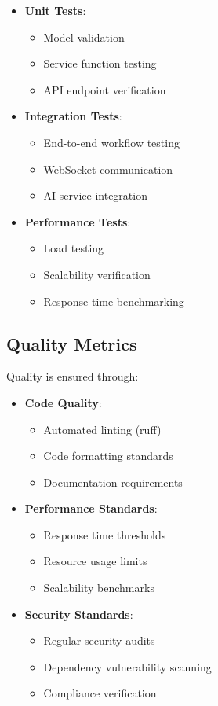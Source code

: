 \begin{itemize}
  \item \textbf{Unit Tests}:
    \begin{itemize}
      \item Model validation
      \item Service function testing
      \item API endpoint verification
    \end{itemize}
    
  \item \textbf{Integration Tests}:
    \begin{itemize}
      \item End-to-end workflow testing
      \item WebSocket communication
      \item AI service integration
    \end{itemize}
    
  \item \textbf{Performance Tests}:
    \begin{itemize}
      \item Load testing
      \item Scalability verification
      \item Response time benchmarking
    \end{itemize}
\end{itemize}

\subsection{Quality Metrics}
Quality is ensured through:

\begin{itemize}
  \item \textbf{Code Quality}:
    \begin{itemize}
      \item Automated linting (ruff)
      \item Code formatting standards
      \item Documentation requirements
    \end{itemize}
    
  \item \textbf{Performance Standards}:
    \begin{itemize}
      \item Response time thresholds
      \item Resource usage limits
      \item Scalability benchmarks
    \end{itemize}
    
  \item \textbf{Security Standards}:
    \begin{itemize}
      \item Regular security audits
      \item Dependency vulnerability scanning
      \item Compliance verification
    \end{itemize}
\end{itemize}
